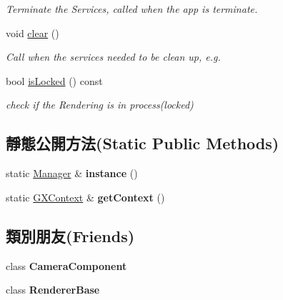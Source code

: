 \begin{DoxyCompactItemize}
\begin{DoxyCompactList}\small\item\em Terminate the Services, called when the app is terminate. \end{DoxyCompactList}\item 
void \hyperlink{class_i_dream_sky_1_1_video_1_1_manager_a869cb21e0a94fb7c0a2a3d6b0b4e536e}{clear} ()
\begin{DoxyCompactList}\small\item\em Call when the services needed to be clean up, e.\+g. \end{DoxyCompactList}\item 
bool \hyperlink{class_i_dream_sky_1_1_video_1_1_manager_ab3ff834d6364a7fa78fb9176deb09056}{is\+Locked} () const 
\begin{DoxyCompactList}\small\item\em check if the Rendering is in process(locked) \end{DoxyCompactList}\end{DoxyCompactItemize}
\subsection*{靜態公開方法(Static Public Methods)}
\begin{DoxyCompactItemize}
\item 
static \hyperlink{class_i_dream_sky_1_1_video_1_1_manager}{Manager} \& {\bfseries instance} ()\hypertarget{class_i_dream_sky_1_1_video_1_1_manager_a85d7ad944649cab481573b3287a26dfe}{}\label{class_i_dream_sky_1_1_video_1_1_manager_a85d7ad944649cab481573b3287a26dfe}

\item 
static \hyperlink{class_i_dream_sky_1_1_g_x_context}{G\+X\+Context} \& {\bfseries get\+Context} ()\hypertarget{class_i_dream_sky_1_1_video_1_1_manager_a657230fb6b985786cc91a2d67ff7306f}{}\label{class_i_dream_sky_1_1_video_1_1_manager_a657230fb6b985786cc91a2d67ff7306f}

\end{DoxyCompactItemize}
\subsection*{類別朋友(Friends)}
\begin{DoxyCompactItemize}
\item 
class {\bfseries Camera\+Component}\hypertarget{class_i_dream_sky_1_1_video_1_1_manager_ae834a5e62eff7d0adb1092a0693388f7}{}\label{class_i_dream_sky_1_1_video_1_1_manager_ae834a5e62eff7d0adb1092a0693388f7}

\item 
class {\bfseries Renderer\+Base}\hypertarget{class_i_dream_sky_1_1_video_1_1_manager_a3be435fc6104d4d670e10e39be9bdf2a}{}\label{class_i_dream_sky_1_1_video_1_1_manager_a3be435fc6104d4d670e10e39be9bdf2a}

\end{DoxyCompactItemize}


